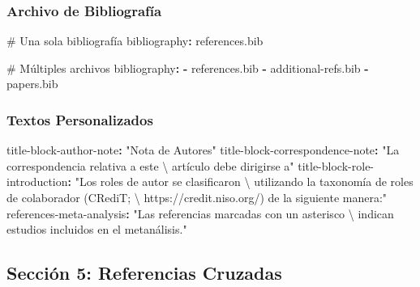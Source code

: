 \documentclass[
  doc,
  floatsintext,
  longtable,
  a4paper,
  nolmodern,
  notxfonts,
  notimes,
  12pt,
  colorlinks=true,linkcolor=blue,citecolor=blue,urlcolor=blue]{apa7}
\newenvironment{Shaded}{\begin{snugshade}}{\end{snugshade}}
\newcommand{\AttributeTok}[1]{\textcolor[rgb]{0.40,0.45,0.13}{#1}}
\newcommand{\CommentTok}[1]{\textcolor[rgb]{0.37,0.37,0.37}{#1}}
\newcommand{\FunctionTok}[1]{\textcolor[rgb]{0.28,0.35,0.67}{#1}}
\newcommand{\KeywordTok}[1]{\textcolor[rgb]{0.00,0.23,0.31}{\textbf{#1}}}
\newcommand{\SpecialCharTok}[1]{\textcolor[rgb]{0.37,0.37,0.37}{#1}}
\newcommand{\StringTok}[1]{\textcolor[rgb]{0.13,0.47,0.30}{#1}}
\begin{document}
\subsubsection{Archivo de
Bibliografía}\label{archivo-de-bibliografuxeda}

\begin{Shaded}
\begin{Highlighting}[]
\CommentTok{\# Una sola bibliografía}
\FunctionTok{bibliography}\KeywordTok{:}\AttributeTok{ references.bib}

\CommentTok{\# Múltiples archivos}
\FunctionTok{bibliography}\KeywordTok{:}
\AttributeTok{  }\KeywordTok{{-}}\AttributeTok{ references.bib}
\AttributeTok{  }\KeywordTok{{-}}\AttributeTok{ additional{-}refs.bib}
\AttributeTok{  }\KeywordTok{{-}}\AttributeTok{ papers.bib}
\end{Highlighting}
\end{Shaded}

\subsubsection{Textos Personalizados}\label{textos-personalizados}

\begin{Shaded}
\begin{Highlighting}[]
\FunctionTok{title{-}block{-}author{-}note}\KeywordTok{:}\AttributeTok{ }\StringTok{"Nota de Autores"}
\FunctionTok{title{-}block{-}correspondence{-}note}\KeywordTok{:}\AttributeTok{ }\StringTok{"La correspondencia relativa a este }\SpecialCharTok{\textbackslash{} }
\StringTok{artículo debe dirigirse a"}
\FunctionTok{title{-}block{-}role{-}introduction}\KeywordTok{:}\AttributeTok{ }\StringTok{"Los roles de autor se clasificaron   }\SpecialCharTok{\textbackslash{} }
\StringTok{utilizando la taxonomía de roles de colaborador (CRediT;             }\SpecialCharTok{\textbackslash{} }
\StringTok{https://credit.niso.org/) de la siguiente manera:"}
\FunctionTok{references{-}meta{-}analysis}\KeywordTok{:}\AttributeTok{ }\StringTok{"Las referencias marcadas con un asterisco }\SpecialCharTok{\textbackslash{} }
\StringTok{indican estudios incluidos en el metanálisis."}
\end{Highlighting}
\end{Shaded}

\subsection{Sección 5: Referencias
Cruzadas}\label{secciuxf3n-5-referencias-cruzadas}
\end{document}
